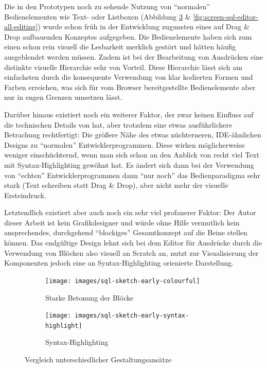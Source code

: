 Die in den Prototypen noch zu sehende Nutzung von ``normalen'' Bedienelementen wie Text- oder Listboxen (Abbildung \ref{fig:compare-colourful} \& \ref{fig:screen-sql-editor-all-editing}) wurde schon früh in der Entwicklung zugunsten eines auf Drag \& Drop aufbauenden Konzeptes aufgegeben. Die Bedienelemente haben sich zum einen schon rein visuell die Lesbarkeit merklich gestört und hätten häufig ausgeblendet werden müssen. Zudem ist bei der Bearbeitung von Ausdrücken eine distinkte visuelle Hierarchie sehr von Vorteil. Diese Hierarchie lässt sich am einfachsten durch die konsequente Verwendung von klar kodierten Formen und Farben erreichen, was sich für vom Browser bereitgestellte Bedienelemente aber nur in engen Grenzen umsetzen lässt.

Darüber hinaus existiert noch ein weiterer Faktor, der zwar keinen Einfluss auf die technischen Details von \idename{} hat, aber trotzdem eine etwas ausführlichere Betrachung rechtfertigt: Die größere Nähe des etwas nüchterneren, IDE-ähnlichen Designs zu ``normalen'' Entwicklerprogrammen. Diese wirken möglicherweise weniger einschüchternd, wenn man sich schon an den Anblick von recht viel Text mit Syntax-Highlighting gewöhnt hat. Es ändert sich dann bei der Verwendung von ``echten'' Entwicklerprogrammen dann ``nur noch'' das Bedienparadigma sehr stark (Text schreiben statt Drag \& Drop), aber nicht mehr der visuelle Ersteindruck.

Letztendlich existiert aber auch noch ein sehr viel profanerer Faktor: Der Autor dieser Arbeit ist kein Grafikdesigner und würde ohne Hilfe vermutlich kein ansprechendes, durchgehend ``blockiges'' Gesamtkonzept auf die Beine stellen können. Das endgültige Design lehnt sich bei dem Editor für Ausdrücke durch die Verwendung von Blöcken also visuell an Scratch an, nutzt zur Visualisierung der Komponenten jedoch eine an Syntax-Highlighting orienierte Darstellung.

\begin{figure}[h]
  \begin{subfigure}[b]{0.45\textwidth}
    \texttt{[image: images/sql-sketch-early-colourful]}
    \caption{Starke Betonung der Blöcke}
    \label{fig:screen-sql-editor-early-colourful}
  \end{subfigure}\hfill
  \begin{subfigure}[b]{0.45\textwidth}
    \texttt{[image: images/sql-sketch-early-syntax-highlight]}
    \caption{Syntax-Highlighting}
    \label{fig:screen-sql-editor-early-syntax-highlighting}
  \end{subfigure}
  \caption{Vergleich unterschiedlicher Gestaltungsansätze}
  \label{fig:compare-colourful}
\end{figure}

